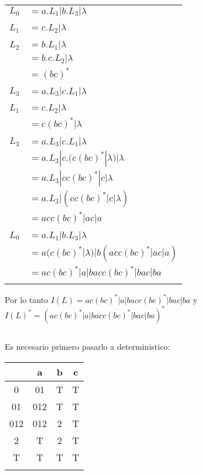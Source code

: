 \begin{tabular}{l l}
$L_0$ & $= a.L_1 | b.L_3 | \lambda$ \\ \\

$L_1$ & $= c.L_2 | \lambda$ \\ \\

$L_2$ & $= b.L_1 | \lambda$ \\
	  & $= b.c.L_2 | \lambda$ \\
	  & $= (bc)^*$ \\ \\

$L_3$ & $= a.L_3 | c.L_1 | \lambda$ \\ \\

$L_1$ & $= c.L_2 | \lambda$ \\
	  & $= c(bc)^* | \lambda$ \\ \\

$L_3$ & $= a.L_3 | c.L_1 | \lambda$ \\
	  & $= a.L_3 | c.(c(bc)^* | \lambda) | \lambda$ \\
	  & $= a.L_3 | cc(bc)^* | c | \lambda$ \\
	  & $= a.L_3 | (cc(bc)^* | c | \lambda)$ \\
	  & $= acc(bc)^* | ac | a$ \\ \\

$L_0$ & $= a.L_1 | b.L_3 | \lambda$ \\
	  & $= a(c(bc)^* | \lambda) | b(acc(bc)^* | ac | a)$ \\
	  & $= ac(bc)^* | a | bacc(bc)^* | bac | ba$ \\ \\
\end{tabular}

Por lo tanto $I(L) = ac(bc)^* | a | bacc(bc)^* | bac | ba$ y $I(L)^* = (ac(bc)^* | a | bacc(bc)^* | bac | ba)^*$

\subsection{}
Es necesario primero pasarlo a deterministico:

\begin{tabular}{c | c | c | c}
	& a 	& b 	& c 	\\
\hline
0 	& 01 	& T 	& T 	\\
01 	& 012 	& T 	& T 	\\
012	& 012 	& 2 	& T 	\\
2 	& T 	& 2 	& T 	\\
T 	& T 	& T 	& T 	\\ \\
\end{tabular}

